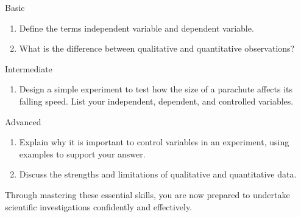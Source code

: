 \begin{tieredquestions}{Basic}
\begin{enumerate}
    \item Define the terms independent variable and dependent variable.
    \item What is the difference between qualitative and quantitative observations?
\end{enumerate}
\end{tieredquestions}

\begin{tieredquestions}{Intermediate}
\begin{enumerate}
    \item Design a simple experiment to test how the size of a parachute affects its falling speed. List your independent, dependent, and controlled variables.
\end{enumerate}
\end{tieredquestions}

\begin{tieredquestions}{Advanced}
\begin{enumerate}
    \item Explain why it is important to control variables in an experiment, using examples to support your answer.
    \item Discuss the strengths and limitations of qualitative and quantitative data.
\end{enumerate}
\end{tieredquestions}


Through mastering these essential skills, you are now prepared to undertake scientific investigations confidently and effectively.
\FloatBarrier
